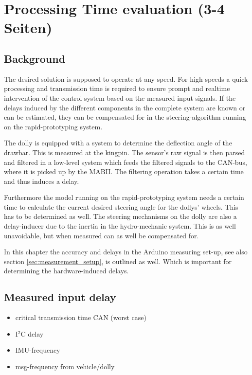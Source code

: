 \documentclass[ExampleMasters.tex]{subfiles}
\begin{document}
\clearpage
\chapter{Processing Time evaluation (3-4 Seiten)}
\label{chap:processing_time_delay}
\section{Background}
The desired solution is supposed to operate at any speed. For high speeds a quick processing and transmission time is required to ensure prompt and realtime intervention of the control system based on the measured input signals. If the delays induced by the different components in the complete system are known or can be estimated, they can be compensated for in the steering-algorithm running on the rapid-prototyping system.

The dolly is equipped with a system to determine the deflection angle of the drawbar. This is measured at the kingpin. The sensor's raw signal is then parsed and filtered in a low-level system which feeds the filtered signals to the CAN-bus, where it is picked up by the MABII. The filtering operation takes a certain time and thus induces a delay. 

Furthermore the model running on the rapid-prototyping system needs a certain time to calculate the current desired steering angle for the dollys' wheels. This has to be determined as well. The steering mechanisms on the dolly are also a delay-inducer due to the inertia in the hydro-mechanic system. This is as well unavoidable, but when measured can as well be compensated for. 

In this chapter the accuracy and delays in the Arduino measuring set-up, see also section \ref{sec:measurement_setup}, is outlined as well. Which is important for determining the hardware-induced delays.


\section{Measured input delay}
\label{sec:measuring_delay}
\begin{itemize}
	\item critical transmission time CAN (worst case)
	\item I$^2$C delay
	\item IMU-frequency
	\item msg-frequency from vehicle/dolly
	
\end{itemize}
\end{document}
